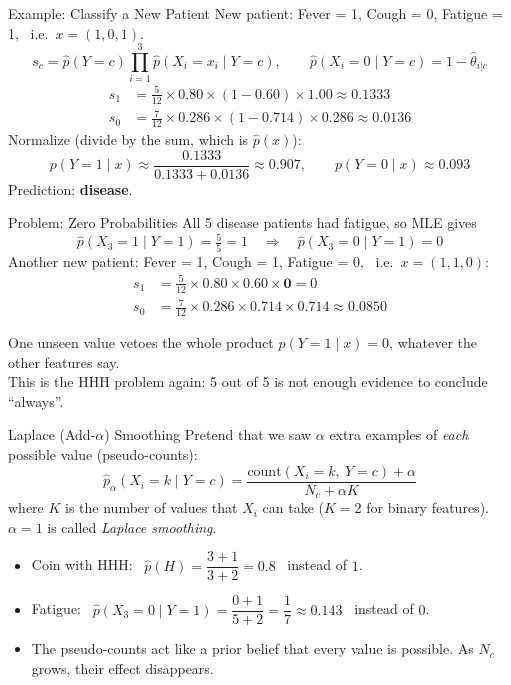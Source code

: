 \documentclass[aspectratio=169]{beamer}
\begin{document}
\begin{frame}{Example: Classify a New Patient}
New patient: Fever = 1, Cough = 0, Fatigue = 1, \ i.e.\ $x=(1,0,1)$.
\[
  s_c = \hat p(Y=c)\prod_{i=1}^3 \hat p(X_i=x_i\mid Y=c),
  \qquad \hat p(X_i=0\mid Y=c) = 1-\hat\theta_{i|c}
\]
\begin{align*}
  s_{1} &= \tfrac{5}{12}\times 0.80\times (1-0.60)\times 1.00 \approx 0.1333\\
  s_{0} &= \tfrac{7}{12}\times 0.286\times (1-0.714)\times 0.286 \approx 0.0136
\end{align*}
Normalize (divide by the sum, which is $\hat p(x)$):
\[
  p(Y=1\mid x) \approx\frac{0.1333}{0.1333+0.0136} \approx 0.907,\qquad
  p(Y=0\mid x) \approx 0.093
\]
Prediction: \textbf{disease}.
\end{frame}

\begin{frame}{Problem: Zero Probabilities}
All 5 disease patients had fatigue, so MLE gives
\[
  \hat p(X_3=1\mid Y=1) = \tfrac{5}{5} = 1
  \quad\Rightarrow\quad
  \hat p(X_3=0\mid Y=1) = 0
\]
Another new patient: Fever = 1, Cough = 1, Fatigue = 0, \ i.e.\ $x=(1,1,0)$:
\begin{align*}
  s_1 &= \tfrac{5}{12}\times 0.80 \times 0.60 \times \mathbf{0} = 0\\
  s_0 &= \tfrac{7}{12}\times 0.286 \times 0.714 \times 0.714 \approx 0.0850
\end{align*}
\begin{alertblock}{One unseen value vetoes the whole product}
$p(Y=1\mid x) = 0$, whatever the other features say.\\
This is the HHH problem again: 5 out of 5 is not enough evidence to conclude ``always''.
\end{alertblock}
\end{frame}

\begin{frame}{Laplace (Add-$\alpha$) Smoothing}
Pretend that we saw $\alpha$ extra examples of \emph{each} possible value (pseudo-counts):
\[
  \hat p_{\alpha}(X_i=k\mid Y=c) = \frac{\text{count}(X_i=k,\ Y=c)+\alpha}{N_c+\alpha K}
\]
where $K$ is the number of values that $X_i$ can take ($K=2$ for binary features).
$\alpha=1$ is called \emph{Laplace smoothing}.

\vspace{0.3cm}
\begin{itemize}
  \item Coin with HHH: \ $\hat p(H) = \dfrac{3+1}{3+2} = 0.8$ \ instead of $1$.
  \item Fatigue: \ $\hat p(X_3=0\mid Y=1) = \dfrac{0+1}{5+2} = \dfrac17 \approx 0.143$ \ instead of $0$.
  \item The pseudo-counts act like a prior belief that every value is possible. As $N_c$ grows, their effect disappears.
\end{itemize}
\end{frame}
\end{document}
